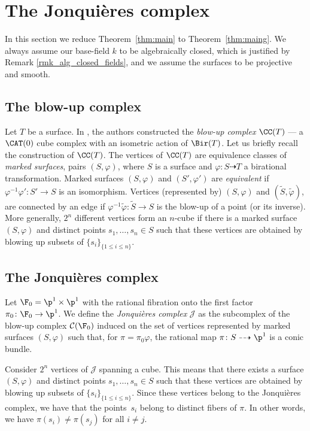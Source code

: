 \section{The Jonquières complex}
\label{sec:Jon}
In this section we reduce Theorem~\ref{thm:main} to Theorem~\ref{thm:maing}. We always assume our base-field $k$ to be algebraically closed, {which is justified by Remark \ref{rmk_alg_closed_fields}, and we assume the} surfaces to be projective and smooth.

\subsection{The blow-up complex}
Let $T$ be a
surface. In \cite{lonjou2021actions}, the authors constructed the \emph{blow-up complex} $\CC(T)$ --- a $\CAT(0)$ cube complex with an isometric action of $\Bir(T)$. Let us briefly recall the construction of $\CC(T)$. The vertices of $\CC(T)$ are equivalence classes of \emph{marked surfaces}, \ie pairs $(S,\varphi)$, where $S$ is a
surface and $\varphi\colon S\dashrightarrow T$ a birational transformation. Marked surfaces $(S,\varphi)$ and $(S',\varphi')$ are \emph{equivalent} if $\varphi^{-1}\varphi'\colon S'\to S$ is an isomorphism.
Vertices (represented by) $(S,\varphi)$ and $(\tilde{S},\tilde{\varphi})$, are connected by an edge if ${\varphi}^{-1}\tilde \varphi\colon \tilde S\to {S}$ is the blow-up of a point (or its inverse). More generally, $2^n$ different vertices form an $n$-cube if there is a marked surface $(S,\varphi)$ and distinct points $s_1,\dots, s_n\in S$ such that these vertices are obtained by blowing up subsets of $\{s_i\}_{\{1\leq i \leq n\}}$.

\subsection{The Jonquières complex}
Let $\F_0=\p^1\times\p^1$ with the rational fibration onto the first factor $\pi_0\colon \F_0\to\p^1$. We define the \emph{Jonquières complex} $\mathscr{J}$ as the subcomplex of the blow-up complex $\mathcal C(\F_0)$ induced on the set of vertices represented by marked surfaces $(S,\varphi)$ such that, for $\pi=\pi_0\varphi$, the rational map
$\pi\colon S\dashrightarrow\p^1$ is a conic bundle.

\begin{remark}\label{remark_cube_Jonquièrescplx}
Consider $2^n$ vertices of $\mathscr{J}$ spanning a cube. This means that there exists a surface $(S,\varphi)$ and distinct points $s_1,\dots, s_n\in S$ such that these vertices are obtained by blowing up subsets of $\{s_i\}_{\{1\leq i \leq n\}}$. Since these vertices belong to the Jonquières complex, we have that the points~$s_i$ belong to distinct fibers of $\pi$. In other words, we have $\pi(s_i)\neq\pi(s_j)$ for all $i\neq j$.
\end{remark}

